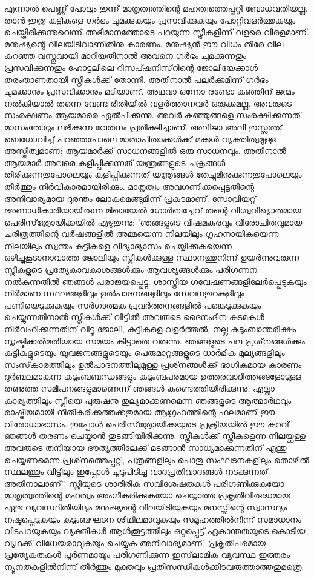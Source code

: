 എന്നാല്‍ പെണ്ണ് പോലും ഇന്ന് മാതൃത്വത്തിന്റെ മഹത്വത്തെപ്പറ്റി ബോധവതിയല്ല. താന്‍ ഇത്ര കുട്ടികളെ ഗര്‍ഭം ചുമക്കുകയും പ്രസവിക്കുകയും പോറ്റിവളര്‍ത്തുകയും ചെയ്തിരിക്കുന്നുവെന്ന് അഭിമാനത്തോടെ പറയുന്ന സ്ത്രീകളിന്ന് വളരെ വിരളമാണ്. മനുഷ്യന്റെ വിലയിടിവാണിതിനു കാരണം. മനുഷ്യന്‍ ഈ വിധം തീരേ വില കുറഞ്ഞ വസ്തുവായി മാറിയതിനാല്‍ അവനെ ഗര്‍ഭം ചുമക്കുന്നതും പ്രസവിക്കുന്നതും ഹോട്ടലിലെ റിസപ്ഷനിസ്‌റിന്റെ ജോലിയേക്കാള്‍ തരംതാണതായി സ്ത്രീകള്‍ക്ക് തോന്നി. അതിനാല്‍ പലര്‍ക്കുമിന്ന് ഗര്‍ഭം ചുമക്കാനും പ്രസവിക്കാനും മടിയാണ്. അഥവാ ഒന്നോ രണ്ടോ കുഞ്ഞിന് ജന്മം നല്‍കിയാല്‍ തന്നെ വേണ്ട രീതിയില്‍ വളര്‍ത്താനവര്‍ ഒരുക്കമല്ല. അവരുടെ സംരക്ഷണം ആയമാരെ ഏല്‍പിക്കുന്നു. അവര്‍ കുഞ്ഞുങ്ങളെ സംരക്ഷിക്കുന്നത് മാസംതോറും ലഭിക്കുന്ന വേതനം പ്രതീക്ഷിച്ചാണ്. അലിജാ അലി ഇസ്സത്ത് ബെഗോവിച്ച് പറഞ്ഞപോലെ മാതാപിതാക്കള്‍ക്ക് മക്കള്‍ വ്യക്തിത്വമുള്ള അസ്തിത്വമാണ്; ആയമാര്‍ക്ക് സാധനങ്ങളില്‍ ഒരു സാധനവും. അതിനാല്‍ ആയമാര്‍ അവരെ കളിപ്പിക്കുന്നത് യന്ത്രങ്ങളുടെ ചക്രങ്ങള്‍ തിരിക്കുന്നതുപോലെയും കുളിപ്പിക്കുന്നത് യന്ത്രങ്ങള്‍ തേച്ചുമിനുക്കുന്നതുപോലെയും തീര്‍ത്തും നിര്‍വികാരമായിരിക്കും.
മാതൃത്വം അവഗണിക്കപ്പെട്ടതിന്റെ അനിവാര്യമായ ദുരന്തം ലോകമെങ്ങുമിന്ന് പ്രകടമാണ്. സോവിയറ്റ് ഭരണാധികാരിയായിരുന്ന മിഖായേല്‍ ഗോര്‍ബച്ചേവ് തന്റെ വിശ്വവിഖ്യാതമായ പെരിസ്‌ത്രോയിക്കയില്‍ എഴുതുന്നു: 'ഞങ്ങളുടെ വിഷമകരവും വീരോചിതവുമായ ചരിത്രത്തിന്റെ വര്‍ഷങ്ങളില്‍ അമ്മയെന്ന നിലയിലും ഗൃഹനായികയെന്ന നിലയിലും സ്വന്തം കുട്ടികളെ വിദ്യാഭ്യാസം ചെയ്യിക്കുകയെന്ന ഒഴിച്ചുകൂടാനാവാത്ത ജോലിയും സ്ത്രീകള്‍ക്കുള്ള സ്ഥാനത്തുനിന്ന് ഉയര്‍ന്നുവരുന്ന സ്ത്രീകളുടെ പ്രത്യേകാവകാശങ്ങള്‍ക്കും ആവശ്യങ്ങള്‍ക്കും പരിഗണന നല്‍കുന്നതില്‍ ഞങ്ങള്‍ പരാജയപ്പെട്ടു. ശാസ്ത്രീയ ഗവേഷണങ്ങളിലേര്‍പ്പെടുകയും നിര്‍മാണ സ്ഥലങ്ങളിലും ഉല്‍പാദനങ്ങളിലും സേവനതുറകളിലും പണിയെടുക്കുകയും സര്‍ഗാത്മക പ്രവര്‍ത്തനങ്ങളില്‍ പങ്കെടുക്കുകയും ചെയ്യുന്നതിനാല്‍ സ്ത്രീകള്‍ക്ക് വീട്ടില്‍ അവരുടെ ദൈനംദിന കടമകള്‍ നിര്‍വഹിക്കുന്നതിന് വീട്ടു ജോലി, കുട്ടികളെ വളര്‍ത്തല്‍, നല്ല കുടുംബാന്തരീക്ഷം സൃഷ്ടിക്കല്‍മതിയായ സമയം കിട്ടാതെ വരുന്നു. ഞങ്ങളുടെ പല പ്രശ്‌നങ്ങള്‍ക്കും കുട്ടികളുടെയും യുവജനങ്ങളുടെയും പെരുമാറ്റങ്ങളുടെ ധാര്‍മിക മൂല്യങ്ങളിലും സംസ്‌കാരത്തിലും ഉല്‍പാദനത്തിലുമുള്ള പ്രശ്‌നങ്ങള്‍ക്ക്  ഭാഗികമായ കാരണം ദുര്‍ബലമാകുന്ന കുടുംബബന്ധങ്ങളും കുടുംബപരമായ ഉത്തരവാദിത്തങ്ങളോടുള്ള തണുത്ത സമീപനങ്ങളുമാണെന്ന് ഞങ്ങള്‍ കണ്ടെത്തിയിരിക്കുന്നു. എല്ലാ കാര്യത്തിലും സ്ത്രീയെ പുരുഷനു തുല്യമാക്കണമെന്ന ഞങ്ങളുടെ ആത്മാര്‍ഥവും രാഷ്ട്രീയമായി നീതീകരിക്കത്തക്കതുമായ ആഗ്രഹത്തിന്റെ ഫലമാണ് ഈ വിരോധാഭാസം. ഇപ്പോള്‍ പെരിസ്‌ത്രോയിക്കയുടെ പ്രക്രിയയില്‍ ഈ കുറവ് ഞങ്ങള്‍ തരണം ചെയ്യാന്‍ തുടങ്ങിയിരിക്കുന്നു. സ്ത്രീകള്‍ക്ക് സ്ത്രീകളെന്ന നിലയ്ക്കുള്ള അവരുടെ തനിയായ ദൗത്യത്തിലേക്ക് മടങ്ങാന്‍ സാധ്യമാക്കുന്നതിന് എന്തു ചെയ്യണമെന്ന പ്രശ്‌നത്തെപ്പറ്റി, പത്രങ്ങളിലും പൊതു സംഘടനകളിലും തൊഴില്‍ സ്ഥലത്തും വീട്ടിലും ഇപ്പോള്‍ ചൂടുപിടിച്ച വാദപ്രതിവാദങ്ങള്‍ നടക്കുന്നത് അതിനാലാണ്''.
സ്ത്രീയുടെ ശാരീരിക സവിശേഷതകള്‍ പരിഗണിക്കുകയോ മാതൃത്വത്തിന്റെ മഹത്വം അംഗീകരിക്കുകയോ ചെയ്യാത്ത പ്രകൃതിവിരുദ്ധമായ ഏതു വ്യവസ്ഥിതിയിലും മനുഷ്യന്റെ വിലയിടിയുകയും മനസ്സിന്റെ സ്വാസ്ഥ്യം നഷ്ടപ്പെടുകയും കുടുംബഘടന ശിഥിലമാവുകയും സമൂഹത്തില്‍നിന്ന് സമാധാനം വിടപറയുകയും വ്യക്തികള്‍ ആള്‍ക്കൂട്ടത്തിലും ഒറ്റപ്പെട്ട് ഏകാന്തതയുടെ കൊടിയ വ്യഥക്ക് വിധേയരാവുകയും ചെയ്യുക അനിവാര്യമാണ്. പ്രകൃതിപരമായ പ്രത്യേകതകള്‍ പൂര്‍ണമായും പരിഗണിക്കുന്ന ഇസ്‌ലാമിക വ്യവസ്ഥ ഇത്തരം ന്യൂനതകളില്‍നിന്ന് തീര്‍ത്തും മുക്തവും പ്രതിസന്ധികള്‍ക്കിടവരുത്താത്തതുമത്രെ.
